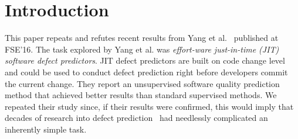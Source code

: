 \documentclass[sigconf]{acmart}
\theoremstyle{break}
\begin{document}
%
%





\maketitle

% 
\section{Introduction}

This paper repeats and refutes recent
results from Yang et al.~\cite{yang2016effort} published at FSE'16.
The task explored by Yang et al. was {\em effort-ware just-in-time (JIT) software defect predictors}.
JIT defect predictors are built on code change level and could be used to conduct defect prediction
right before developers commit the current change. They report an unsupervised software quality prediction method that
achieved
better results than standard supervised methods. 
We repeated their study since, if their results were confirmed,
this would imply that decades of research into defect prediction~\cite{lessmann2008benchmarking,hassan2009predicting,fu2016differential,fu2016tuning,graves2000predicting,menzies2007data,hall2012systematic,nagappan2005use,jiang2013personalized,kim2007predicting,kim2008classifying,jing2014dictionary,lee2011micro,moser2008comparative,nam2013transfer,wang2016automatically,yang2016effort,kamei2013large}
had needlessly complicated an inherently simple task.
\end{document}
